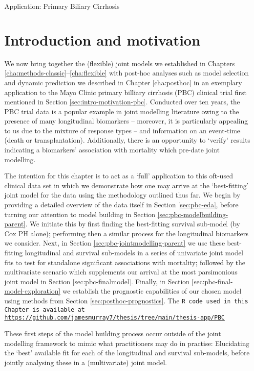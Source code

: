 \begin{chapter}{\label{cha:app-PBC}Application: Primary Biliary Cirrhosis}
  \section{Introduction and motivation}\label{sec:PBC-intro-motiv}
  We now bring together the (flexible) joint models we established in Chapters \ref{cha:methods-classic}--\ref{cha:flexible} with post-hoc analyses such as model selection and dynamic prediction we described in Chapter \ref{cha:posthoc} in an exemplary application to the Mayo Clinic primary billiary cirrhosis (PBC) clinical trial \citep{PBCarticle} first mentioned in Section \ref{sec:intro-motivation-pbc}. Conducted over ten years, the PBC trial data is a popular example in joint modelling literature owing to the presence of many longitudinal biomarkers -- moreover, it is particularly appealing to us due to the mixture of response types -- and information on an event-time (death or transplantation). Additionally, there is an opportunity to `verify' results indicating a biomarkers' association with mortality \citep{PBCarticle} which pre-date joint modelling.

  The intention for this chapter is to act as a `full' application to this oft-used clinical data set in which we demonstrate how one may arrive at the `best-fitting' joint model for the data using the methodology outlined thus far. We begin by providing a detailed overview of the data itself in Section \ref{sec:pbc-eda}, before turning our attention to model building in Section \ref{sec:pbc-modelbuilding-parent}. We initiate this by first finding the best-fitting survival sub-model (\ie by Cox PH alone); performing then a similar process for the longitudinal biomarkers we consider. Next, in Section \ref{sec:pbc-jointmodelling-parent} we use these best-fitting longitudinal and survival sub-models in a series of univariate joint model fits to test for standalone significant associations with mortality; followed by the multivariate scenario which supplements our arrival at the most parsimonious joint model in Section \ref{sec:pbc-finalmodel}. Finally, in Section \ref{sec:pbc-final-model-exploration} we establish the prognostic capabilities of our chosen model using methods from Section \ref{sec:posthoc-prognostics}. The \tt{R} code used in this Chapter is available at \url{https://github.com/jamesmurray7/thesis/tree/main/thesis-app/PBC}

  \begin{remark}
    These first steps of the model building process occur outside of the joint modelling framework to mimic what practitioners may do in practise: Elucidating the `best' available fit for each of the longitudinal and survival sub-models, before jointly analysing these in a (multivariate) joint model.
  \end{remark}


\end{chapter}
